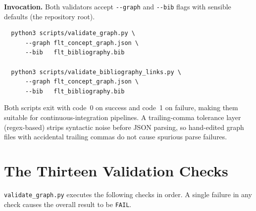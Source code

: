 \medskip
\noindent\textbf{Invocation.}  Both validators accept \texttt{-{}-graph} and \texttt{-{}-bib} flags with sensible defaults (the repository root).

\begin{verbatim}
  python3 scripts/validate_graph.py \
      --graph flt_concept_graph.json \
      --bib   flt_bibliography.bib

  python3 scripts/validate_bibliography_links.py \
      --graph flt_concept_graph.json \
      --bib   flt_bibliography.bib
\end{verbatim}

\noindent Both scripts exit with code~0 on success and code~1 on failure, making them suitable for continuous-integration pipelines.  A trailing-comma tolerance layer (regex-based) strips syntactic noise before JSON parsing, so hand-edited graph files with accidental trailing commas do not cause spurious parse failures.

\section{The Thirteen Validation Checks}
\label{sec:thirteen-checks}

\texttt{validate\_graph.py} executes the following checks in order.  A single failure in any check causes the overall result to be \texttt{FAIL}.

